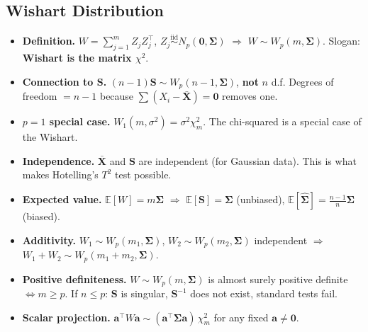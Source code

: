 \documentclass[12pt, a4paper]{article}
\begin{document}
\subsection*{Wishart Distribution}
\begin{itemize}[itemsep=5pt]
  \item \textbf{Definition.} $W = \sum_{j=1}^m Z_j Z_j^\top$, $Z_j \overset{\mathrm{iid}}{\sim} N_p(\mathbf{0}, \boldsymbol{\Sigma})$ $\Rightarrow$ $W \sim W_p(m, \boldsymbol{\Sigma})$. Slogan: \textbf{Wishart is the matrix $\chi^2$}.
  \item \textbf{Connection to $\mathbf{S}$.} $(n-1)\mathbf{S} \sim W_p(n-1, \boldsymbol{\Sigma})$, \textbf{not} $n$ d.f. Degrees of freedom $= n-1$ because $\sum(X_i - \bar{\mathbf{X}}) = \mathbf{0}$ removes one.
  \item \textbf{$p = 1$ special case.} $W_1(m, \sigma^2) = \sigma^2 \chi^2_m$. The chi-squared is a special case of the Wishart.
  \item \textbf{Independence.} $\bar{\mathbf{X}}$ and $\mathbf{S}$ are independent (for Gaussian data). This is what makes Hotelling's $T^2$ test possible.
  \item \textbf{Expected value.} $\mathbb{E}[W] = m\boldsymbol{\Sigma}$ $\Rightarrow$ $\mathbb{E}[\mathbf{S}] = \boldsymbol{\Sigma}$ (unbiased), $\mathbb{E}[\hat{\boldsymbol{\Sigma}}] = \frac{n-1}{n}\boldsymbol{\Sigma}$ (biased).
  \item \textbf{Additivity.} $W_1 \sim W_p(m_1, \boldsymbol{\Sigma})$, $W_2 \sim W_p(m_2, \boldsymbol{\Sigma})$ independent $\Rightarrow$ $W_1 + W_2 \sim W_p(m_1 + m_2, \boldsymbol{\Sigma})$.
  \item \textbf{Positive definiteness.} $W \sim W_p(m, \boldsymbol{\Sigma})$ is almost surely positive definite $\Leftrightarrow m \geq p$. If $n \leq p$: $\mathbf{S}$ is singular, $\mathbf{S}^{-1}$ does not exist, standard tests fail.
  \item \textbf{Scalar projection.} $\mathbf{a}^\top W \mathbf{a} \sim (\mathbf{a}^\top \boldsymbol{\Sigma} \mathbf{a})\,\chi^2_m$ for any fixed $\mathbf{a} \neq \mathbf{0}$.
\end{itemize}
\end{document}
